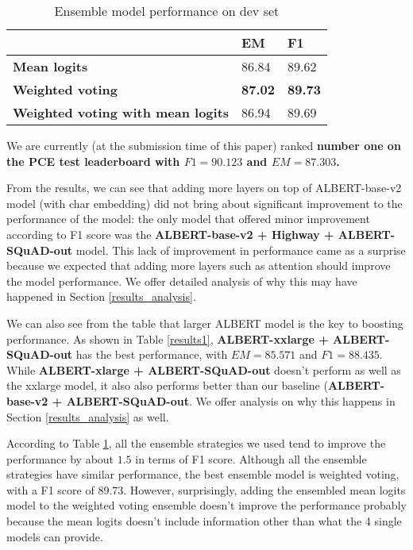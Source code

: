 \documentclass{article}
\begin{document}
\begin{table}[H]
\label{tab:baseline_model_ensemble}
\centering
\caption{Ensemble model performance on dev set}
\begin{tabular}{@{}lll@{}}
\toprule
                                                        & \textbf{EM}    & \textbf{F1} \\ \midrule
\textbf{Mean logits}                                    & 86.84          & 89.62       \\
\textbf{Weighted voting}                                & \textbf{87.02} & \textbf{89.73}       \\
\textbf{Weighted voting with mean logits}               & 86.94          & 89.69       \\ \bottomrule
\end{tabular}\label{results2}
\end{table}






We are currently (at the submission time of this paper) ranked \textbf{number one on the PCE test leaderboard with $F1 = 90.123$ and $EM = 87.303$.}

From the results, we can see that adding more layers on top of ALBERT-base-v2 model (with char embedding) did not bring about significant improvement to the performance of the model: the only model that offered minor improvement according to F1 score was the \textbf{ALBERT-base-v2 + Highway + ALBERT-SQuAD-out} model. This lack of improvement in performance came as a surprise because we expected that adding more layers such as attention should improve the model performance. We offer detailed analysis of why this may have happened in Section \ref{results_analysis}.

We can also see from the table that larger ALBERT model is the key to boosting performance. As shown in Table \ref{results1}, \textbf{ALBERT-xxlarge + ALBERT-SQuAD-out} has the best performance, with $EM = 85.571$ and $F1 = 88.435$. While \textbf{ALBERT-xlarge + ALBERT-SQuAD-out} doesn't perform as well as the xxlarge model, it also also performs better than our baseline (\textbf{ALBERT-base-v2 + ALBERT-SQuAD-out}. We offer analysis on why this happens in Section \ref{results_analysis} as well.

According to Table \ref{results2}, all the ensemble strategies we used tend to improve the performance by about $1.5$ in terms of F1 score. Although all the ensemble strategies have similar performance, the best ensemble model is weighted voting, with a F1 score of 89.73. However, surprisingly, adding the ensembled mean logits model to the weighted voting ensemble doesn't improve the performance probably because the mean logits doesn't include information other than what the 4 single models can provide.
\end{document}
